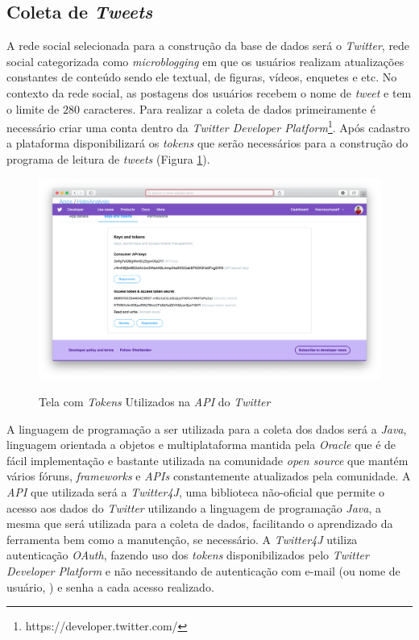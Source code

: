 \subsection{Coleta de \textit{Tweets}}
\label{subsec:coletatweets}
A rede social selecionada para a construção da base de dados será o \textit{Twitter}, rede social categorizada como \textit{microblogging} em que os usuários realizam atualizações constantes de conteúdo sendo ele textual, de figuras, vídeos, enquetes e etc. No contexto da rede social, as postagens dos usuários recebem o nome de \textit{tweet} e tem o limite de $280$ caracteres. 
Para realizar a coleta de dados primeiramente é necessário criar uma conta dentro da \textit{Twitter Developer Platform}\footnote{https://developer.twitter.com/}. Após cadastro a plataforma disponibilizará os \textit{tokens} que serão necessários para a construção do programa de leitura de \textit{tweets} (Figura \ref{fig:twitterdeveloperplatform}).

\begin{figure}[!h]
\centering 
\caption{Tela com \textit{Tokens} Utilizados na \textit{API} do \textit{Twitter}}
\includegraphics[scale=0.3]{imagens/twitterdeveloperplatform.png}
\label{fig:twitterdeveloperplatform}
\end{figure}

A linguagem de programação a ser utilizada para a coleta dos dados será a \textit{Java}, linguagem orientada a objetos e multiplataforma mantida pela \textit{Oracle} que é de fácil implementação e bastante utilizada na comunidade \textit{open source} que mantém vários fóruns, \textit{frameworks} e \textit{APIs} constantemente atualizados pela comunidade. A \textit{API} que utilizada será a \textit{Twitter4J}, uma biblioteca não-oficial que permite o acesso aos dados do \textit{Twitter} utilizando a linguagem de programação \textit{Java}, a mesma que será utilizada para a coleta de dados, facilitando o aprendizado da ferramenta bem como a manutenção, se necessário. A \textit{Twitter4J} utiliza autenticação \textit{OAuth}, fazendo uso dos \textit{tokens} disponibilizados pelo \textit{Twitter Developer Platform} e não necessitando de autenticação com e-mail (ou nome de usuário, ) e senha a cada acesso realizado. 


